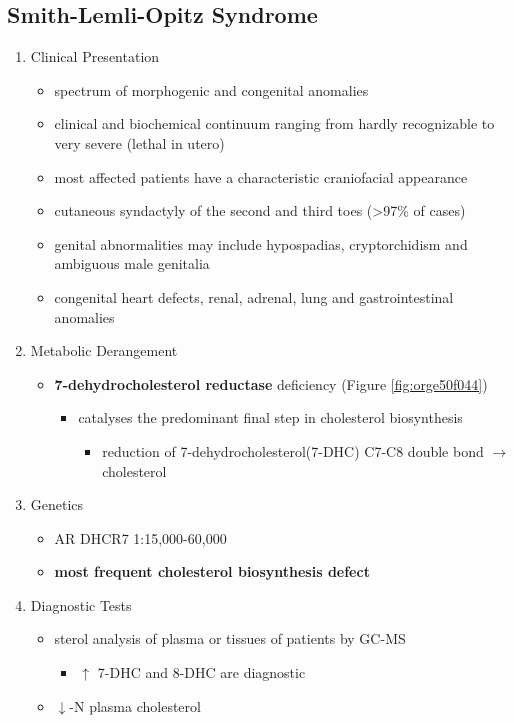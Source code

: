 \documentclass[12pt]{scrartcl}
\begin{document}
\subsection{Smith-Lemli-Opitz Syndrome}
\label{sec:org34d8199}
\begin{enumerate}
\item Clinical Presentation
\label{sec:org23c70ba}
\begin{itemize}
\item spectrum of morphogenic and congenital anomalies
\item clinical and biochemical continuum ranging from hardly recognizable
to very severe (lethal in utero)
\item most affected patients have a characteristic craniofacial appearance
\item cutaneous syndactyly of the second and third toes (>97\% of cases)
\item genital abnormalities may include hypospadias, cryptorchidism and
ambiguous male genitalia
\item congenital heart defects, renal, adrenal, lung and gastrointestinal
anomalies
\end{itemize}

\item Metabolic Derangement
\label{sec:org1fc5f66}
\begin{itemize}
\item \textbf{7-dehydrocholesterol reductase} deficiency (Figure \ref{fig:orge50f044})
\begin{itemize}
\item catalyses the predominant final step in cholesterol biosynthesis
\begin{itemize}
\item reduction of 7-dehydrocholesterol(7-DHC) C7-C8 double bond \(\to\) cholesterol
\end{itemize}
\end{itemize}
\end{itemize}

\item Genetics
\label{sec:org399229c}
\begin{itemize}
\item AR DHCR7 1:15,000-60,000
\item \textbf{most frequent cholesterol biosynthesis defect}
\end{itemize}

\item Diagnostic Tests
\label{sec:org1c03307}
\begin{itemize}
\item sterol analysis of plasma or tissues of patients by GC-MS
\begin{itemize}
\item \(\uparrow\) 7-DHC and 8-DHC are diagnostic
\end{itemize}
\item \(\downarrow\)-N plasma cholesterol
\end{itemize}


\end{enumerate}
\end{document}

